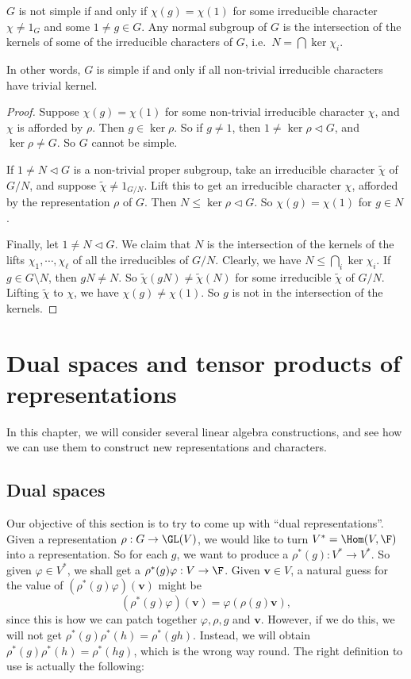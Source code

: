 \documentclass[a4paper]{article}
\begin{document}
\begin{lemma}
  $G$ is not simple if and only if $\chi(g) = \chi(1)$ for some irreducible character $\chi \not= 1_G$ and some $1 \not= g \in G$. Any normal subgroup of $G$ is the intersection of the kernels of some of the irreducible characters of $G$, i.e.\ $N = \bigcap \ker \chi_i$.
\end{lemma}
In other words, $G$ is simple if and only if all non-trivial irreducible characters have trivial kernel.

\begin{proof}
  Suppose $\chi(g) = \chi(1)$ for some non-trivial irreducible character $\chi$, and $\chi$ is afforded by $\rho$. Then $g \in \ker \rho$. So if $g \not= 1$, then $1 \not= \ker \rho \lhd G$, and $\ker \rho \not= G$. So $G$ cannot be simple.

  If $1 \not= N \lhd G$ is a non-trivial proper subgroup, take an irreducible character $\tilde{\chi}$ of $G/N$, and suppose $\tilde{\chi} \not= 1_{G/N}$. Lift this to get an irreducible character $\chi$, afforded by the representation $\rho$ of $G$. Then $N \leq \ker \rho \lhd G$. So $\chi(g) = \chi(1)$ for $g \in N$.

  Finally, let $1 \not= N \lhd G$. We claim that $N$ is the intersection of the kernels of the lifts $\chi_1, \cdots, \chi_\ell$ of all the irreducibles of $G/N$. Clearly, we have $N \leq \bigcap_i \ker \chi_i$. If $g \in G \setminus N$, then $gN \not= N$. So $\tilde{\chi}(gN) \not= \tilde{\chi}(N)$ for some irreducible $\tilde{\chi}$ of $G/N$. Lifting $\tilde{\chi}$ to $\chi$, we have $\chi(g) \not= \chi(1)$. So $g$ is not in the intersection of the kernels. %
\end{proof}

\section{Dual spaces and tensor products of representations}
In this chapter, we will consider several linear algebra constructions, and see how we can use them to construct new representations and characters.

\subsection{Dual spaces}
Our objective of this section is to try to come up with ``dual representations''. Given a representation $\rho: G \to \GL(V)$, we would like to turn $V^* = \Hom(V, \F)$ into a representation. So for each $g$, we want to produce a $\rho^*(g): V^* \to V^*$. So given $\varphi \in V^*$, we shall get a $\rho^*(g) \varphi: V \to \F$. Given $\mathbf{v} \in V$, a natural guess for the value of $(\rho^*(g)\varphi)(\mathbf{v})$ might be
\[
  (\rho^*(g) \varphi)(\mathbf{v}) = \varphi(\rho(g)\mathbf{v}),
\]
since this is how we can patch together $\varphi, \rho, g$ and $\mathbf{v}$. However, if we do this, we will not get $\rho^*(g) \rho^*(h) = \rho^*(gh)$. Instead, we will obtain $\rho^*(g) \rho^*(h) = \rho^*(hg)$, which is the wrong way round. The right definition to use is actually the following:
\end{document}
